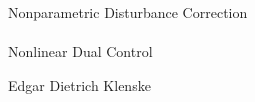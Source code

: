 \begin{titlepage}
    \begin{center}

        \hfill

        \vfill

        \begingroup
            \color{dred}\sffamily\Huge{}\selectfont
            Nonparametric Disturbance Correction\\
            \\
            Nonlinear Dual Control
            \\
            \bigskip
        \endgroup

        \vfill

        \sffamily\Large{}\selectfont
        Edgar Dietrich Klenske\\

        \vfill

        \myYear

        \vfill

    \end{center}
\end{titlepage}
